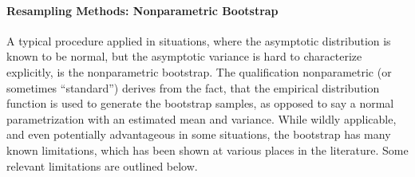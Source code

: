 \documentclass[12pt,a4paper,english]{article} %
\numberwithin{equation}{section}
\theoremstyle{definition}
\theoremstyle{remark}
\theoremstyle{plain}
\begin{document}


\paragraph{Resampling Methods: Nonparametric Bootstrap}

A typical procedure applied in situations, where the asymptotic distribution is known to be normal, but the asymptotic variance is hard to characterize explicitly, is the nonparametric bootstrap.
The qualification nonparametric (or sometimes ``standard'') derives from the fact, that the empirical distribution function is used to generate the bootstrap samples, as opposed to say a normal parametrization with an estimated mean and variance.
While wildly applicable, and even potentially advantageous in some situations, the bootstrap has many known limitations, which has been shown at various places in the literature.
Some relevant limitations are outlined below.
\end{document}

